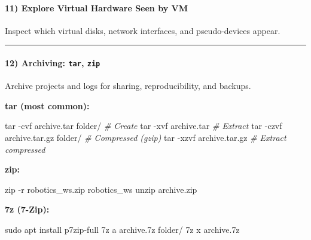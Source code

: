 \documentclass[
  english,
  paper=a4,
  oneside  ,captions=tableheading
]{scrartcl}
\newenvironment{Shaded}{}{}
\newcommand{\AttributeTok}[1]{\textcolor[rgb]{0.49,0.56,0.16}{#1}}
\newcommand{\CommentTok}[1]{\textcolor[rgb]{0.38,0.63,0.69}{\textit{#1}}}
\newcommand{\ExtensionTok}[1]{#1}
\newcommand{\FunctionTok}[1]{\textcolor[rgb]{0.02,0.16,0.49}{#1}}
\newcommand{\NormalTok}[1]{#1}
\begin{document}
\paragraph{11) Explore Virtual Hardware Seen by
VM}\label{explore-virtual-hardware-seen-by-vm}

Inspect which virtual disks, network interfaces, and pseudo-devices
appear.

\begin{center}\rule{0.5\linewidth}{0.5pt}\end{center}

\paragraph{\texorpdfstring{12) Archiving: \texttt{tar},
\texttt{zip}}{12) Archiving: tar, zip}}\label{archiving-tar-zip}

Archive projects and logs for sharing, reproducibility, and backups.

\textbf{tar (most common):}

\begin{Shaded}
\begin{Highlighting}[]
\FunctionTok{tar} \AttributeTok{{-}cvf}\NormalTok{ archive.tar folder/           }\CommentTok{\# Create}
\FunctionTok{tar} \AttributeTok{{-}xvf}\NormalTok{ archive.tar                   }\CommentTok{\# Extract}
\FunctionTok{tar} \AttributeTok{{-}czvf}\NormalTok{ archive.tar.gz folder/       }\CommentTok{\# Compressed (gzip)}
\FunctionTok{tar} \AttributeTok{{-}xzvf}\NormalTok{ archive.tar.gz               }\CommentTok{\# Extract compressed}
\end{Highlighting}
\end{Shaded}

\textbf{zip:}

\begin{Shaded}
\begin{Highlighting}[]
\FunctionTok{zip} \AttributeTok{{-}r}\NormalTok{ robotics\_ws.zip robotics\_ws}
\FunctionTok{unzip}\NormalTok{ archive.zip}
\end{Highlighting}
\end{Shaded}

\textbf{7z (7-Zip):}

\begin{Shaded}
\begin{Highlighting}[]
\FunctionTok{sudo}\NormalTok{ apt install p7zip{-}full}
\ExtensionTok{7z}\NormalTok{ a archive.7z folder/}
\ExtensionTok{7z}\NormalTok{ x archive.7z}
\end{Highlighting}
\end{Shaded}
\end{document}

